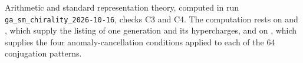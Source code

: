 Arithmetic and standard representation theory, computed in run \texttt{ga\_sm\_chirality\_2026-10-16}, checks C3 and C4. The computation rests on  and , which supply the listing of one generation and its hypercharges, and on , which supplies the four anomaly-cancellation conditions applied to each of the 64 conjugation patterns.
